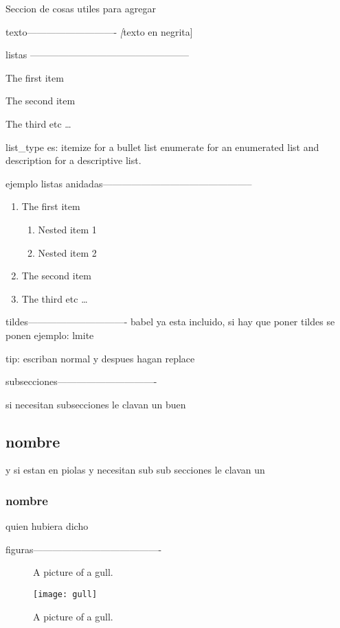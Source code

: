 

\iffalse
Seccion de cosas utiles para agregar

texto----------------------------
\textit[texto en negrita]




listas --------------------------------------------------
\begin{list_type}  
\item The first item 
\item The second item 
\item The third etc \ldots 
\end{list_type}

list_type es:
itemize for a bullet list
enumerate for an enumerated list and
description for a descriptive list.

ejemplo listas anidadas-----------------------------------------------

\begin{enumerate}
\item The first item
\begin{enumerate}
\item Nested item 1
\item Nested item 2
\end{enumerate}
\item The second item
\item The third etc \ldots
\end{enumerate}

tildes-------------------------------
babel ya esta incluido, si hay que poner tildes se ponen 
ejemplo: lmite

tip: escriban normal y despues hagan replace

subsecciones-------------------------------

si necesitan subsecciones le clavan un buen \subsection*{nombre}

y si estan en piolas y necesitan sub sub secciones le clavan un \subsubsection*{nombre}

quien hubiera dicho

figuras----------------------------------------

\begin{figure}%
  \caption{A picture of a gull.} %
  \centering
    \texttt{[image: gull]}
    \caption{A picture of a gull.} %
\end{figure}


